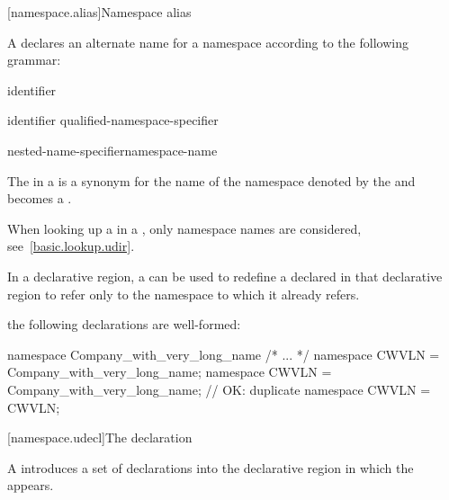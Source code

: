 [namespace.alias]{Namespace alias}%
%
%

\pnum
A  declares an alternate name for a
namespace according to the following grammar:

\begin{bnf}
\br
        identifier
\end{bnf}

\begin{bnf}
\br
         identifier \terminal{=} qualified-namespace-specifier \terminal{;}
\end{bnf}

\begin{bnf}
\br
    nested-name-specifier\opt namespace-name
\end{bnf}

\pnum
The  in a  is
a synonym for the name of the namespace denoted by the
 and becomes a
.
\begin{note}
When looking up a  in a
, only namespace names are
considered, see~\ref{basic.lookup.udir}.
\end{note}

\pnum
In a declarative region, a  can be
used to redefine a  declared in that
declarative region to refer only to the namespace to which it already
refers.
\begin{example}
the following declarations are well-formed:

\begin{codeblock}
namespace Company_with_very_long_name { /* ... */ }
namespace CWVLN = Company_with_very_long_name;
namespace CWVLN = Company_with_very_long_name;          // OK: duplicate
namespace CWVLN = CWVLN;
\end{codeblock}
\end{example}

[namespace.udecl]{The  declaration}%

\pnum
A  introduces a set of declarations into the declarative
region in which the  appears.

